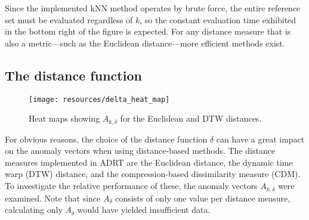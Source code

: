 Since the implemented kNN method operates by brute force, the entire reference set must be evaluated regardless of $k$, so the constant evaluation time exhibited in the bottom right of the figure is expected. For any distance measure that is also a metric---such as the Euclidean distance---more efficient methods exist.

\subsection{The distance function}

\begin{figure}[ht]
    \begin{center}
        \texttt{[image: resources/delta\_heat\_map]}
    \end{center}
    \caption{\small{Heat maps showing $A_{k, \delta}$ for the Euclidean and DTW distances.}}
\label{fig:delta_heat_map}
\end{figure}

For obvious reasons, the choice of the distance function $\delta$ can have a great impact on the anomaly vectors when using distance-based methods. The distance measures implemented in ADRT are the Euclidean distance, the dynamic time warp (DTW) distance, and the compression-based dissimilarity measure (CDM). To investigate the relative performance of these, the anomaly vectors $A_{k, \delta}$ were examined. Note that since $A_{\delta}$ consists of only one value per distance measure, calculating only $A_\delta$ would have yielded insufficient data.


